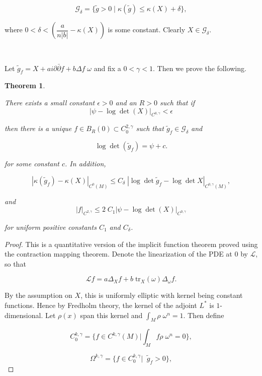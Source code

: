 \documentclass[11pt,letterpaper]{amsart}
\newcommand{\pbp}{\partial \bar{\partial}}
\newtheorem{theorem}{Theorem}[section]
\numberwithin{equation}{section}
\begin{document}
\begin{itemize}
$$\mathcal G_{\delta} = \{\tilde g >0 \; | \; \kappa(\tilde g) \leq \kappa(X) + \delta \},$$



\noindent where $0<\delta< \left(\dfrac{a}{n|b|} - \kappa(X)\right)$ is some constant. Clearly $X \in \mathcal G_{\delta}$.



\


Let $\tilde g_f = X + a i \pbp f + b \Delta f \;\omega$ and fix a $0 < \gamma <1$. Then we prove the following.

\begin{theorem}\label{QIFT}

There exists a small constant $\epsilon >0$ and an $R>0$ such that if
$$|\psi - \log\det(X)|_{C^{0, \gamma}} < \epsilon$$

\noindent  then there is a unique $f \in B_R(0) \subset C^{2, \gamma}_{0}$ such that $\tilde g_f \in \mathcal G_{\delta}$ and

$$\log\det(\tilde g_f) = \psi + c.$$


\noindent for some constant $c$. In addition,

$$|\kappa(\tilde g_f) - \kappa(X)|_{C^0(M)} \leq C_{\delta} \; | \log \det \tilde g_f -  \log \det X|_{C^{0,\gamma}(M)},$$ 

\noindent and
$$|f|_{C^{2, \gamma}} \leq 2\;C_1 |\psi - \log\det(X)|_{C^{0, \gamma}}$$

\noindent for uniform positive constants $C_1$ and $C_{\delta}$.


    
\end{theorem}


\begin{proof}

 This is a quantitative version of the implicit function theorem proved using the contraction mapping theorem. Denote the linearization of the PDE at $0$ by $\mathcal{L}$, so that

$$\mathcal{L}f = a\Delta_{X}f + b \;\mbox{tr}_{X}(\omega) \Delta_{\omega} f .$$

By the assumption on $X$, this is uniformly elliptic with kernel being constant functions. Hence by Fredholm theory, the kernel of the adjoint $L^*$ is $1$-dimensional. Let $\rho(x)$ span this kernel and $\int_M \rho \; \omega^n = 1$. Then define 
 
 $$C_0^{k,\gamma} = \{f \in C^{k,\gamma}(M) | \int_M f \rho \; \omega^n= 0  \},$$

  $$\Omega^{k, \gamma} = \{f \in C_0^{k, \gamma} |  \;\; \tilde g_f >0\},$$


\end{proof}
\end{itemize}
\end{document}
